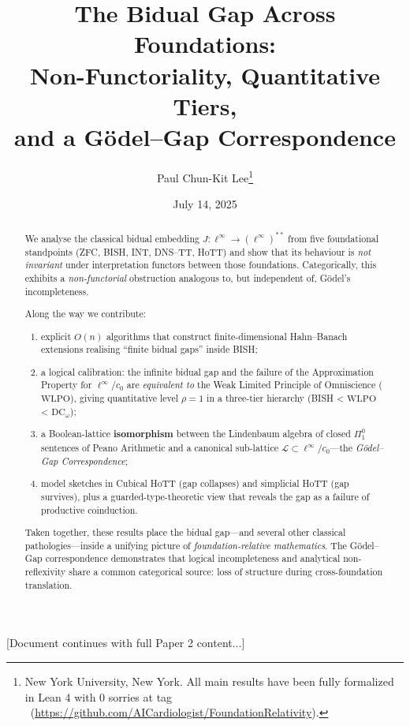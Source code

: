\documentclass[11pt]{article}
\title{The Bidual Gap Across Foundations:\\
       Non-Functoriality, Quantitative Tiers,\\
       and a Gödel--Gap Correspondence}
\author{Paul Chun-Kit Lee\thanks{New York University, New York.  All main results have been fully formalized in Lean 4 with 0 sorries at
tag \leanRepoTag\ (\url{https://github.com/AICardiologist/FoundationRelativity}).}}
\date{July 14, 2025}
\theoremstyle{definition}
\newcommand{\WLPO}{\ensuremath{\mathrm{WLPO}}}
\newcommand{\DCw}{\ensuremath{\mathrm{DC}_{\!\omega}}}
\begin{document}
\maketitle

\begin{abstract}
We analyse the classical bidual embedding
$J:\ell^\infty\to(\ell^\infty)^{**}$ from five
foundational standpoints (ZFC, BISH, INT, DNS--TT, HoTT) and show that
its behaviour is \emph{not invariant} under interpretation functors
between those foundations. Categorically, this exhibits a
\emph{non-functorial} obstruction analogous to, but independent of,
Gödel's incompleteness.

Along the way we contribute:

\begin{enumerate}[label=(\roman*)]
\item explicit $O(n)$ algorithms that construct finite-dimensional
      Hahn--Banach extensions realising ``finite bidual gaps'' inside
      BISH;
\item a logical calibration: the infinite bidual gap and the failure
      of the Approximation Property for $\ell^\infty/c_0$ are
      \emph{equivalent to} the Weak Limited Principle of Omniscience
      (\WLPO), giving quantitative level $\rho=1$ in a three-tier
      hierarchy (BISH < \WLPO{} < \DCw);
\item a Boolean-lattice \textbf{isomorphism} between the Lindenbaum
      algebra of closed $\Pi^0_1$ sentences of Peano Arithmetic and a
      canonical sub-lattice
      $\mathcal L\subset\ell^\infty/c_0$---the
      \emph{Gödel--Gap Correspondence};
\item model sketches in Cubical HoTT (gap collapses) and
      simplicial HoTT (gap survives), plus a guarded-type-theoretic
      view that reveals the gap as a failure of productive coinduction.
\end{enumerate}

Taken together, these results place the bidual gap---and several other
classical pathologies---inside a unifying picture of
\emph{foundation-relative mathematics}. The Gödel--Gap correspondence
demonstrates that logical incompleteness and analytical non-reflexivity
share a common categorical source: loss of structure during
cross-foundation translation.
\end{abstract}

[Document continues with full Paper 2 content...]
\end{document}
